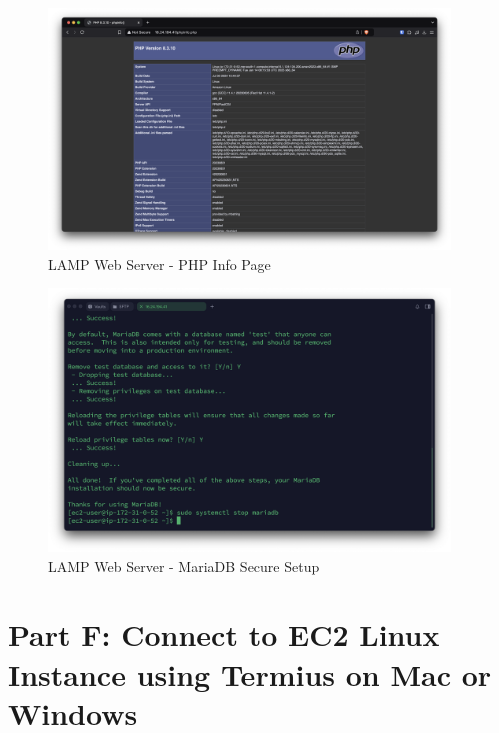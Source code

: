\documentclass[a4paper,12pt]{article}
\begin{document}
\begin{figure}[H]
    \centering
    \includegraphics[width=0.95\textwidth]{lamp-server-3.png}
    \caption{LAMP Web Server - PHP Info Page}
    \label{fig:lamp3}
\end{figure}

\begin{figure}[H]
    \centering
    \includegraphics[width=0.95\textwidth]{lamp-server-4.png}
    \caption{LAMP Web Server - MariaDB Secure Setup}
    \label{fig:lamp4}
\end{figure}

\newpage

\section{Part F: Connect to EC2 Linux Instance using Termius on Mac or Windows}
\end{document}

